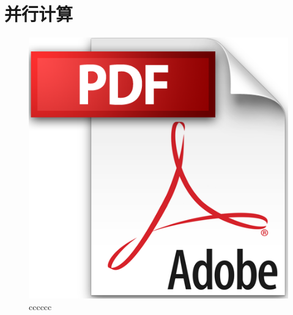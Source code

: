 \documentclass[../../main]{subfiles}
\begin{document}
\section{并行计算}
\zhlipsum[6]
\begin{figure}[htp]
  \centering
  \includegraphics[scale=0.3]{figs/fig02-01-01pdflogo}
  \caption{cccccc}
\end{figure}  
\end{document}
